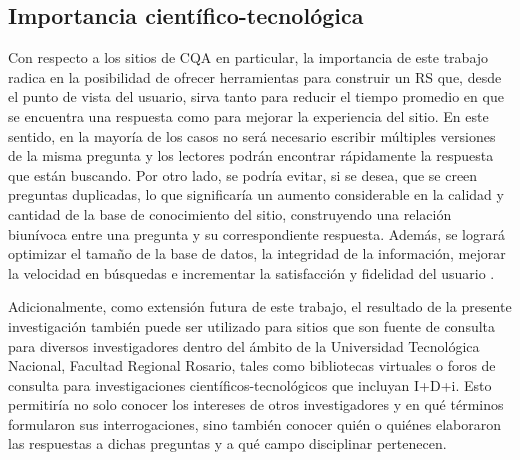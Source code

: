 \subsection{Importancia científico-tecnológica}
Con respecto a los sitios de CQA en particular, la importancia de este trabajo radica en la posibilidad de ofrecer herramientas para construir un RS que, desde el punto de vista del usuario, sirva tanto para reducir el tiempo promedio en que se encuentra una respuesta como para mejorar la experiencia del sitio. En este sentido, en la mayoría de los casos no será necesario escribir múltiples versiones de la misma pregunta y los lectores podrán encontrar rápidamente la respuesta que están buscando. Por otro lado, se podría evitar, si se desea, que se creen preguntas duplicadas, lo que significaría un aumento considerable en la calidad y cantidad de la base de conocimiento del sitio, construyendo una relación biunívoca entre una pregunta y su correspondiente respuesta. Además, se logrará optimizar el tamaño de la base de datos, la integridad de la información, mejorar la velocidad en búsquedas e incrementar la satisfacción y fidelidad del usuario \citep{ricci2011introduction}.

\bigskip Adicionalmente, como extensión futura de este trabajo, el resultado de la presente investigación también puede ser utilizado para sitios que son fuente de consulta para diversos investigadores dentro del ámbito de la Universidad Tecnológica Nacional, Facultad Regional Rosario, tales como bibliotecas virtuales o foros de consulta para investigaciones científicos-tecnológicos que incluyan I+D+i. Esto permitiría no solo conocer los intereses de otros investigadores y en qué términos formularon sus interrogaciones, sino también conocer quién o quiénes elaboraron las respuestas a dichas preguntas y a qué campo disciplinar pertenecen.


